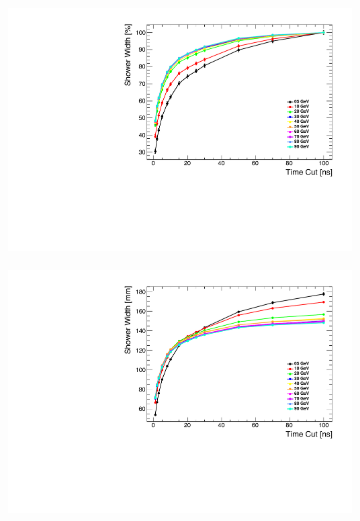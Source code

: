 \begin{figure}[htbp!]
  \centering
  \begin{minipage}{.45\textwidth}
    \begin{subfigure}[t]{0.7\textwidth}
      \centering
      \includegraphics[width=1\linewidth]{chap6/fig_TimingILD/NoSmearing/ShowerWidth_TimeCuts_noSmearing}
      \caption{} \label{fig:ShowerWidthNoSmearing}
    \end{subfigure}
    \begin{subfigure}[t]{0.7\textwidth}
      \centering
      \includegraphics[width=1\linewidth]{chap6/fig_TimingILD/NoSmearing/ShowerWidthAbso_TimeCuts_noSmearing}
      \caption{} \label{fig:ShowerWidthAbsoNoSmearing}
    \end{subfigure}
  \end{minipage}

\end{figure}
